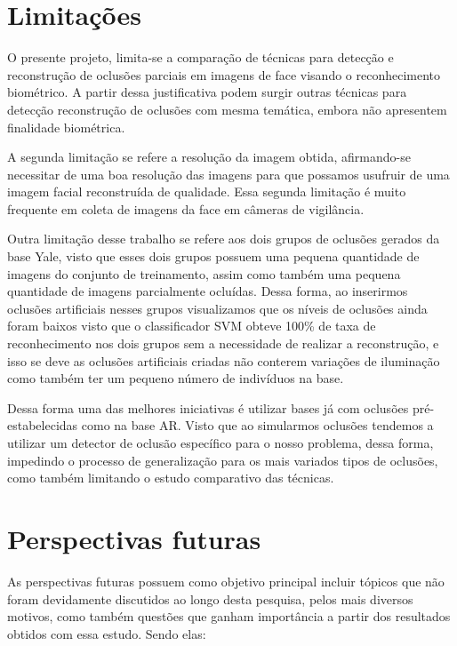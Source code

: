 \section{Limitações}
O presente projeto, limita-se a comparação de técnicas para detecção e reconstrução de oclusões parciais em imagens de face visando o reconhecimento biométrico. A partir dessa justificativa podem surgir outras técnicas para detecção reconstrução de oclusões com mesma temática, embora não apresentem finalidade biométrica.

A segunda limitação se refere a resolução da imagem obtida, afirmando-se necessitar de uma boa resolução das imagens para que possamos usufruir de uma imagem facial reconstruída de qualidade. Essa segunda limitação é muito frequente em coleta de imagens da face em câmeras de vigilância.

Outra limitação desse trabalho se refere aos dois grupos de oclusões gerados da base Yale, visto que esses dois grupos  possuem uma pequena quantidade de imagens do conjunto de treinamento, assim como também uma pequena quantidade de imagens parcialmente ocluídas. Dessa forma, ao inserirmos oclusões artificiais nesses grupos visualizamos que os níveis de oclusões ainda foram baixos visto que o classificador SVM obteve 100\% de taxa de reconhecimento nos dois grupos sem a necessidade de realizar a reconstrução, e isso se deve as oclusões artificiais criadas não conterem variações de iluminação como também ter um pequeno número de indivíduos na base. 

Dessa forma uma das melhores iniciativas é utilizar bases já com oclusões pré-estabelecidas como na base AR. Visto que  ao simularmos oclusões tendemos a utilizar um detector de oclusão específico para o nosso problema, dessa forma, impedindo o processo de generalização para os mais variados tipos de oclusões, como também limitando o estudo comparativo das técnicas.


\section{Perspectivas futuras}
As perspectivas futuras possuem como objetivo principal incluir tópicos que não foram devidamente discutidos ao longo desta pesquisa, pelos mais diversos motivos, como também questões que ganham importância a partir dos resultados obtidos com essa estudo. Sendo elas:

